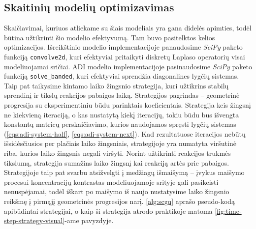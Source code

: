\subsection{Skaitinių modelių optimizavimas}
Skaičiavimai, kuriuos atliekame su šiais modeliais yra gana didelės apimties, todėl būtina užtikrinti šio modelio efektyvumą. Tam buvo pasitelktos kelios optimizacijos. Išreikštinio modelio implementacijoje panaudosime \textit{SciPy} paketo funkciją \texttt{convolve2d}, kuri efektyviai pritaikyti diskretų Laplaso operatorių visai modeliuojamai sričiai. ADI modelio implementacijoje pasinaudosime \textit{SciPy} paketo funkciją \texttt{solve\_banded}, kuri efektyviai sprendžia diagonalines lygčių sistemas. Taip pat taikysime kintamo laiko žingsnio strategija, kuri užtikrins stabilų sprendinį ir tikslų reakcijos pabaigos laiką. Strategijos pagrindas -- geometrinė progresija su eksperimentiniu būdu parinktais koeficientais. Strategija keis žingsnį ne kiekvieną iteraciją, o kas nustatytą kiekį iteracijų, tokiu būdu bus išvengta konstantų matricų perskaičiavimo, kurios naudojamos spręsti lygčių sistemas (\ref{eqs:adi-system-half}, \ref{eqs:adi-system-next}). Kad rezultatuose iteracijos nebūtų išsidėsčiusios per plačiais laiko žingsniais, strategijoje yra numatyta viršutinė riba, kurios laiko žingsnis negali viršyti. Norint užtikrinti reakcijos trukmės tikslumą, strategija sumažins laiko žingsnį kai reakciją artės prie pabaigos. Strategijoje taip pat svarbu atsižvelgti į medžiagų išmaišymą -- įvykus maišymo procesui koncentracijų kontrastas modeliuojamoje srityje gali pasikeisti nenuspėjamai, todėl iškart po maišymo iš naujo nustatysime laiko žingsnio reikšmę į pirmąjį geometrinės progresijos narį. \ref{alg:scgq} aprašo pseudo-kodą apibūdintai strategijai, o kaip ši strategija atrodo praktikoje matoma \ref{fig:time-step-strategy-visual}-ame pavyzdyje.
